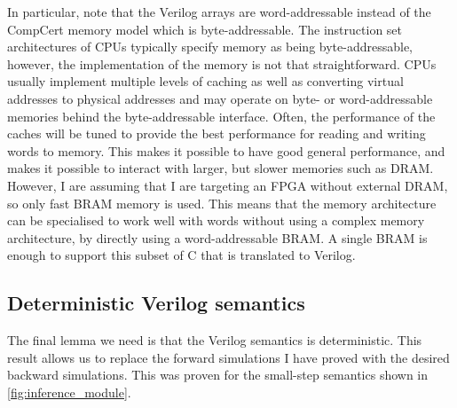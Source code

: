 In particular, note that the Verilog arrays are word-addressable instead of the
CompCert memory model which is byte-addressable.  The instruction set
architectures of \glspl{CPU} typically specify memory as being byte-addressable,
however, the implementation of the memory is not that straightforward.
\Glspl{CPU} usually implement multiple levels of caching as well as converting
virtual addresses to physical addresses and may operate on byte- or
word-addressable memories behind the byte-addressable interface.  Often, the
performance of the caches will be tuned to provide the best performance for
reading and writing words to memory.  This makes it possible to have good
general performance, and makes it possible to interact with larger, but slower
memories such as \gls{DRAM}.  However, I are assuming that I are targeting an
\gls{FPGA} without external \gls{DRAM}, so only fast \gls{BRAM} memory is used.
This means that the memory architecture can be specialised to work well with
words without using a complex memory architecture, by directly using a
word-addressable \gls{BRAM}.  A single \gls{BRAM} is enough to support this
subset of C that is translated to Verilog.


\subsection{Deterministic Verilog semantics}%
\label{sec:proof:deterministic}

The final lemma we need is that the Verilog semantics is deterministic. This
result allows us to replace the forward simulations I have proved with the
desired backward simulations.  This was proven for the small-step semantics
shown in \cref{fig:inference_module}.


